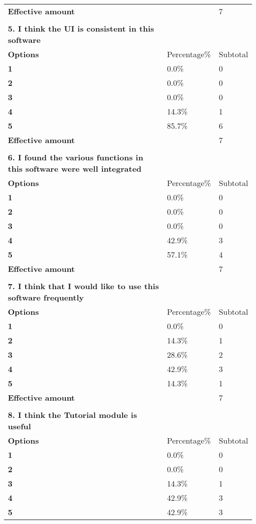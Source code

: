 \documentclass[
]{article}
\begin{document}
\begin{longtable}[]{@{}lll@{}}
\textbf{Effective amount} & & 7 \\
& & \\
\textbf{5. I think the UI is consistent in this software} & & \\
\textbf{Options} & Percentage\% & Subtotal \\
\textbf{1} & 0.0\% & 0 \\
\textbf{2} & 0.0\% & 0 \\
\textbf{3} & 0.0\% & 0 \\
\textbf{4} & 14.3\% & 1 \\
\textbf{5} & 85.7\% & 6 \\
\textbf{Effective amount} & & 7 \\
& & \\
\textbf{6. I found the various functions in this software were well
integrated } & & \\
\textbf{Options} & Percentage\% & Subtotal \\
\textbf{1} & 0.0\% & 0 \\
\textbf{2} & 0.0\% & 0 \\
\textbf{3} & 0.0\% & 0 \\
\textbf{4} & 42.9\% & 3 \\
\textbf{5} & 57.1\% & 4 \\
\textbf{Effective amount} & & 7 \\
& & \\
\textbf{7. I think that I would like to use this software frequently } &
& \\
\textbf{Options} & Percentage\% & Subtotal \\
\textbf{1} & 0.0\% & 0 \\
\textbf{2} & 14.3\% & 1 \\
\textbf{3} & 28.6\% & 2 \\
\textbf{4} & 42.9\% & 3 \\
\textbf{5} & 14.3\% & 1 \\
\textbf{Effective amount} & & 7 \\
& & \\
\textbf{8. I think the Tutorial module is useful } & & \\
\textbf{Options} & Percentage\% & Subtotal \\
\textbf{1} & 0.0\% & 0 \\
\textbf{2} & 0.0\% & 0 \\
\textbf{3} & 14.3\% & 1 \\
\textbf{4} & 42.9\% & 3 \\
\textbf{5} & 42.9\% & 3 \\

\end{longtable}
\end{document}

